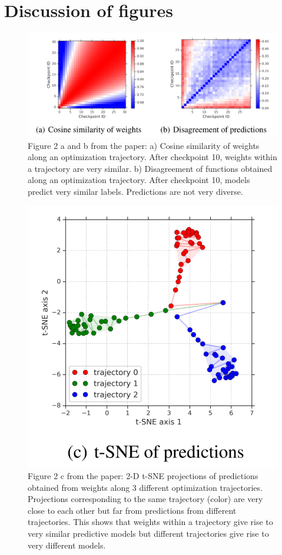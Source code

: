 \section{Discussion of figures}
\begin{figure}[H]
	\centering
	\includegraphics[width=0.7\linewidth]{./Figures/Figure2ab.png}
	\caption{Figure 2 a and b from the paper: 
		a) Cosine similarity of weights along an optimization trajectory. After checkpoint 10, weights within a trajectory are very similar.
	b) Disagreement of functions obtained along an optimization trajectory. After checkpoint 10, models predict very similar labels. Predictions are not very diverse.}
	\label{}
\end{figure}
\begin{figure}[H]
	\centering
	\includegraphics[width=0.5\linewidth]{./Figures/Figure2c.png}
	\caption{Figure 2 c from the paper: 
		2-D t-SNE projections of predictions obtained from weights along 3 different optimization trajectories. Projections corresponding to the same trajectory (color) are very close to each other but far from predictions from different trajectories. This shows that weights within a trajectory give rise to very similar predictive models but different trajectories give rise to very different models.}
	\label{}
\end{figure}

